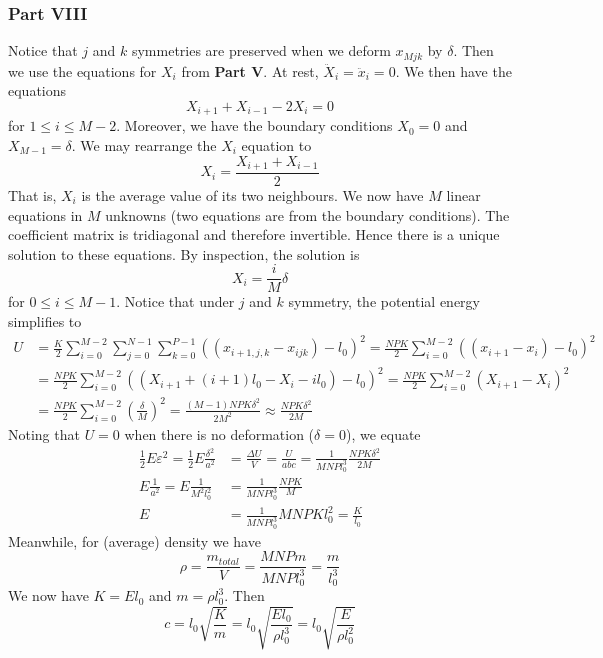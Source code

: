 \documentclass[letterpaper,12pt]{article}
\begin{document}
\begin{flushleft}
    \subsubsection*{Part VIII}
    Notice that $j$ and $k$ symmetries are preserved when we deform $x_{Mjk}$ by $\delta$. Then we use the equations for $X_i$ from \textbf{Part V}. At rest, $\ddot{X}_i = \ddot{x}_i = 0$. We then have the equations
    $$X_{i+1} + X_{i-1} - 2X_i = 0$$
    for $1 \leq i \leq M-2$. Moreover, we have the boundary conditions $X_0 = 0$ and $X_{M-1} = \delta$. We may rearrange the $X_i$ equation to
    $$X_i = \frac{X_{i+1} + X_{i-1}}{2}$$
    That is, $X_i$ is the average value of its two neighbours. We now have $M$ linear equations in $M$ unknowns (two equations are from the boundary conditions). The coefficient matrix is tridiagonal and therefore invertible. Hence there is a unique solution to these equations. By inspection, the solution is
    $$X_i = \frac{i}{M} \delta$$
    for $0 \leq i \leq M-1$. Notice that under $j$ and $k$ symmetry, the potential energy simplifies to
    \begin{align*}
        U &= \frac{K}{2}\sum_{i=0}^{M-2}\sum_{j=0}^{N-1}\sum_{k=0}^{P-1}\left((x_{i+1,j,k} - x_{ijk}) - l_0\right)^2 = \frac{NPK}{2}\sum_{i=0}^{M-2}\left((x_{i+1} - x_{i}) - l_0\right)^2 \\
        &= \frac{NPK}{2}\sum_{i=0}^{M-2}\left((X_{i+1} + (i+1)l_0 - X_{i} - il_0) - l_0\right)^2 = \frac{NPK}{2}\sum_{i=0}^{M-2}\left(X_{i+1} - X_{i}\right)^2 \\
        &= \frac{NPK}{2}\sum_{i=0}^{M-2}\left(\frac{\delta}{M}\right)^2 = \frac{(M-1)NPK\delta^2}{2M^2} \approx \frac{NPK\delta^2}{2M}
    \end{align*}
    Noting that $U = 0$ when there is no deformation ($\delta = 0$), we equate
    \begin{align*}
        \frac{1}{2}E\varepsilon^2 = \frac{1}{2}E\frac{\delta^2}{a^2} &= \frac{\Delta U}{V} = \frac{U}{abc} = \frac{1}{MNPl_0^3} \frac{NPK\delta^2}{2M} \\
        E\frac{1}{a^2} = E\frac{1}{M^2l_0^2} &= \frac{1}{MNPl_0^3} \frac{NPK}{M} \\
        E &= \frac{1}{MNPl_0^3} MNPKl_0^2 = \frac{K}{l_0}
    \end{align*}
    Meanwhile, for (average) density we have
    $$\rho = \frac{m_{total}}{V} = \frac{MNPm}{MNPl_0^3} = \frac{m}{l_0^3}$$
    We now have $K = El_0$ and $m = \rho l_0^3$. Then
    $$c = l_0\sqrt{\frac{K}{m}} = l_0\sqrt{\frac{El_0}{\rho l_0^3}} = l_0\sqrt{\frac{E}{\rho l_0^2}}$$

\end{flushleft}
\end{document}
